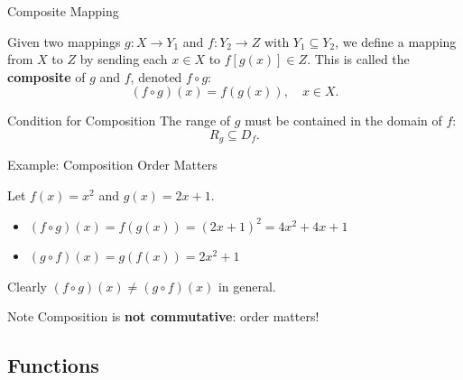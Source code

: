 \documentclass[aspectratio=169,10pt]{beamer}
\begin{document}
\begin{frame}{Composite Mapping}
  \begin{definition}
    Given two mappings $g\colon X\to Y_1$ and $f\colon Y_2\to Z$ with $Y_1\subseteq Y_2$,
    we define a mapping from $X$ to $Z$ by sending each $x\in X$ to $f[g(x)]\in Z$.
    \pause
    This is called the \textbf{composite} of $g$ and $f$, denoted $f\circ g$:
    \[
      (f\circ g)(x) = f(g(x)),\quad x\in X.
    \]
  \end{definition}
  \pause
  \begin{alertblock}{Condition for Composition}
    The range of $g$ must be contained in the domain of $f$:
    \[
      R_g \subseteq D_f.
    \]
  \end{alertblock}
\end{frame}

\begin{frame}{Example: Composition Order Matters}
  \begin{example}
    Let $f(x)=x^2$ and $g(x)=2x+1$.
    \pause
    \begin{itemize}
      \item $(f\circ g)(x) = f(g(x)) = (2x+1)^2 = 4x^2+4x+1$
      \pause
      \item $(g\circ f)(x) = g(f(x)) = 2x^2+1$
    \end{itemize}
    \pause
    Clearly $(f\circ g)(x) \neq (g\circ f)(x)$ in general.
  \end{example}
  \pause
  \begin{block}{Note}
    Composition is \textbf{not commutative}: order matters!
  \end{block}
\end{frame}

\subsection{Functions}
\end{document}
